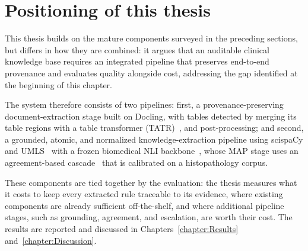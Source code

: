 \section{Positioning of this thesis}\label{section:background-positioning-of-thesis}

This thesis builds on the mature components surveyed in the preceding sections, but differs in how they are combined: it argues that an auditable clinical knowledge base requires an integrated pipeline that preserves end-to-end provenance and evaluates quality alongside cost, addressing the gap identified at the beginning of this chapter.

The system therefore consists of two pipelines: first, a provenance-preserving document-extraction stage built on Docling, with tables detected by merging its table regions with a table transformer (TATR)~\parencite{smock2022pubtables1mcomprehensivetable}, and post-processing; and second, a grounded, atomic, and normalized knowledge-extraction pipeline using scispaCy and UMLS~\parencite{neumann2019scispacy, bodenreider2004umls} with a frozen biomedical NLI backbone~\parencite{deka2023pubmedbertextended}, whose MAP stage uses an agreement-based cascade~\parencite{kolawole2025abc} that is calibrated on a histopathology corpus.

These components are tied together by the evaluation: the thesis measures what it costs to keep every extracted rule traceable to its evidence, where existing components are already sufficient off-the-shelf, and where additional pipeline stages, such as grounding, agreement, and escalation, are worth their cost. The results are reported and discussed in Chapters~\ref{chapter:Results} and~\ref{chapter:Discussion}.